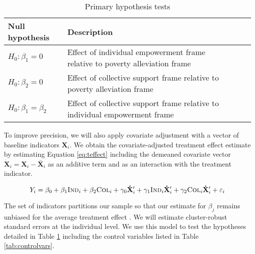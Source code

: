 \documentclass[11pt, a4paper]{article}\usepackage[]{graphicx}\usepackage[]{color}
\begin{document}
        \begin{table}[h]
        \centering
        \caption{Primary hypothesis tests}
        \label{tab:hypotheses}
        \begin{tabular}{@{}lllll@{}}
        \toprule
        Null hypothesis                                     & Description                                          &  &  &  \\ \midrule
        $H_0: \beta_1 = 0$ & Effect of individual empowerment frame relative to poverty alleviation frame &  &  &  \\
        $H_0: \beta_2 = 0$ & Effect of collective support frame relative to poverty alleviation frame &  &  &  \\
        $H_0: \beta_1 = \beta_2$ & Effect of collective support frame relative to individual empowerment frame &  &  &  \\ \bottomrule
        \end{tabular}
        \end{table}

        To improve precision, we will also apply covariate adjustment with a vector of baseline indicators $\mathbf{X}_i$. We obtain the covariate-adjusted treatment effect estimate by estimating Equation \ref{eq:teffect} including the demeaned covariate vector $\mathbf{\dot X}_{i} = \mathbf{X}_{i} - \mathbf{\bar X}_{i}$ as an additive term and as an interaction with the treatment indicator. %

        \begin{equation} \label{eq:controls}
            Y_{i} = \beta_{0} + \beta_{1}\text{\textsc{Ind}}_{i} + \beta_{2}\text{\textsc{Col}}_{i} + \gamma_{0} \mathbf{\dot X}'_i + \gamma_{1}\text{\textsc{Ind}}_{i} \mathbf{\dot X}'_i + \gamma_{2}\text{\textsc{Col}}_{i} \mathbf{\dot X}'_i + \varepsilon_{i}
        \end{equation}

        The set of indicators partitions our sample so that our estimate for $\beta_j$ remains unbiased for the average treatment effect \parencite{lin_agnostic_2013}. We will estimate cluster-robust standard errors at the individual level. We use this model to test the hypotheses detailed in Table \ref{tab:hypotheses} including the control variables listed in Table \ref{tab:controlvars}.
\end{document}
